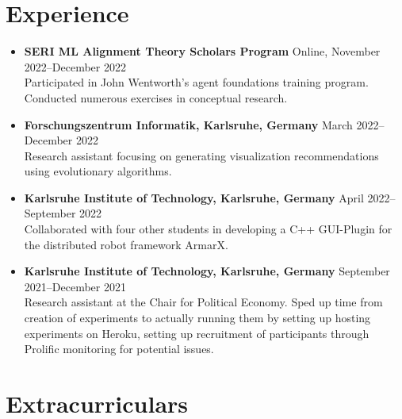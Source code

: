 \documentclass[letterpaper,9pt]{article}
\begin{document}
\section{Experience}
\begin{itemize}
  \item \textbf{SERI ML Alignment Theory Scholars Program} \hfill Online, November 2022--December 2022 \\
  Participated in John Wentworth's agent foundations training program. Conducted numerous exercises in conceptual research.

  \item \textbf{Forschungszentrum Informatik, Karlsruhe, Germany} \hfill March 2022--December 2022 \\
  Research assistant focusing on generating visualization recommendations using evolutionary algorithms.

  \item \textbf{Karlsruhe Institute of Technology, Karlsruhe, Germany} \hfill April 2022--September 2022 \\
  Collaborated with four other students in developing a C++ GUI-Plugin for the distributed robot framework ArmarX.

  \item \textbf{Karlsruhe Institute of Technology, Karlsruhe, Germany} \hfill September 2021--December 2021 \\
  Research assistant at the Chair for Political Economy. Sped up time from creation of experiments to actually running them by setting up hosting experiments on Heroku, setting up recruitment of participants through Prolific monitoring for potential issues.
\end{itemize}


\section{Extracurriculars}
\end{document}
